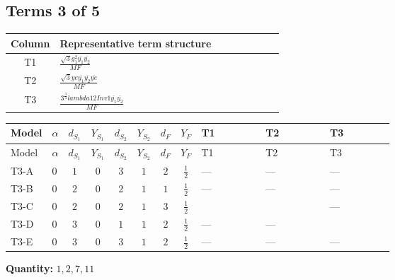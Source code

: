 \documentclass[8pt]{article}
\begin{document}
\begin{landscape}
\subsection*{Terms 3 of 5}
\begin{center}
\begin{tabular}{@{}c >{\raggedright\arraybackslash}p{0.82\linewidth}@{}}
\toprule
Column & Representative term structure \\
\midrule
T1 & \(\displaystyle \frac{\sqrt{3} g_{1}^{2} \overline{y_{1}} \overline{y_{2}}}{MF}\) \\
\midrule
T2 & \(\displaystyle \frac{\sqrt{3} ye \overline{y_{1}} \overline{y_{2}} \overline{ye}}{MF}\) \\
\midrule
T3 & \(\displaystyle \frac{3^{\frac{3}{4}} lambda12Inv1 \overline{y_{1}} \overline{y_{2}}}{MF}\) \\
\midrule
\bottomrule
\end{tabular}
\end{center}
\smallskip
\tiny
\begin{longtable}{@{}llcccccc >{\raggedright\arraybackslash}p{0.21\linewidth} >{\raggedright\arraybackslash}p{0.21\linewidth} >{\raggedright\arraybackslash}p{0.21\linewidth}@{}}
\toprule
Model & $\alpha$ & $d_{S_1}$ & $Y_{S_1}$ & $d_{S_2}$ & $Y_{S_2}$ & $d_F$ & $Y_F$ & T1 & T2 & T3 \\
\midrule
\endfirsthead
\toprule
Model & $\alpha$ & $d_{S_1}$ & $Y_{S_1}$ & $d_{S_2}$ & $Y_{S_2}$ & $d_F$ & $Y_F$ & T1 & T2 & T3 \\
\midrule
\endhead
T3-A & $0$ & $1$ & $0$ & $3$ & $1$ & $2$ & $\frac{1}{2}$ & --- & --- & --- \\
\midrule
T3-B & $0$ & $2$ & $0$ & $2$ & $1$ & $1$ & $\frac{1}{2}$ & --- & --- & --- \\
\midrule
T3-C & $0$ & $2$ & $0$ & $2$ & $1$ & $3$ & $\frac{1}{2}$ & \scriptsize\adjustbox{max width=\linewidth}{$\begin{gathered} \frac{\sqrt{3} g_{1}^{2} \overline{y_{1}} \overline{y_{2}}}{16 MF}\end{gathered}$} & \scriptsize\adjustbox{max width=\linewidth}{$\begin{gathered} - \frac{\sqrt{3} ye \overline{y_{1}} \overline{y_{2}} \overline{ye}}{24 MF}\end{gathered}$} & --- \\
\midrule
T3-D & $0$ & $3$ & $0$ & $1$ & $1$ & $2$ & $\frac{1}{2}$ & --- & --- & \scriptsize\adjustbox{max width=\linewidth}{$\begin{gathered} \frac{3^{\frac{3}{4}} lambda12Inv1 \overline{y_{1}} \overline{y_{2}}}{6 MF}\end{gathered}$} \\
\midrule
T3-E & $0$ & $3$ & $0$ & $3$ & $1$ & $2$ & $\frac{1}{2}$ & --- & --- & --- \\
\midrule
\bottomrule
\end{longtable}
\clearpage
\noindent\textbf{Quantity: }$\mathrm{1,2,7,11}$\par\smallskip

\end{landscape}
\end{document}
